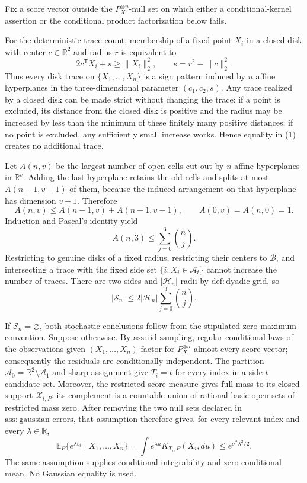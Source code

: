 Fix a score vector outside the \(P_X^{\otimes n}\)-null set on which either a conditional-kernel assertion or the conditional product factorization below fails.

For the deterministic trace count, membership of a fixed point \(X_i\) in a closed disk with center \(c\in\mathbb R^2\) and radius \(r\) is equivalent to
\[
 2c^{\mathsf T}X_i+s\ge \lVert X_i\rVert_2^2,
 \qquad s=r^2-\lVert c\rVert_2^2. \tag{1}
\]
Thus every disk trace on \(\{X_1,\ldots,X_n\}\) is a sign pattern induced by \(n\) affine hyperplanes in the three-dimensional parameter \((c_1,c_2,s)\).  Any trace realized by a closed disk can be made strict without changing the trace: if a point is excluded, its distance from the closed disk is positive and the radius may be increased by less than the minimum of these finitely many positive distances; if no point is excluded, any sufficiently small increase works.  Hence equality in (1) creates no additional trace.

Let \(A(n,v)\) be the largest number of open cells cut out by \(n\) affine hyperplanes in \(\mathbb R^v\).  Adding the last hyperplane retains the old cells and splits at most \(A(n-1,v-1)\) of them, because the induced arrangement on that hyperplane has dimension \(v-1\).  Therefore
\[
 A(n,v)\le A(n-1,v)+A(n-1,v-1),
 \qquad A(0,v)=A(n,0)=1. \tag{2}
\]
Induction and Pascal's identity yield
\[
 A(n,3)\le\sum_{j=0}^3\binom nj. \tag{3}
\]
Restricting to genuine disks of a fixed radius, restricting their centers to \(\mathcal B\), and intersecting a trace with the fixed side set \(\{i:X_i\in\mathcal A_t\}\) cannot increase the number of traces.  There are two sides and \(|\mathcal H_n|\) radii by \(\mathrm{def:dyadic\text{-}grid}\), so
\[
 |\mathscr S_n|\le2|\mathcal H_n|\sum_{j=0}^3\binom nj. \tag{4}
\]

If \(\mathscr S_n=\varnothing\), both stochastic conclusions follow from the stipulated zero-maximum convention.  Suppose otherwise.  By \(\mathrm{ass:iid\text{-}sampling}\), regular conditional laws of the observations given \((X_1,\ldots,X_n)\) factor for \(P_X^{\otimes n}\)-almost every score vector; consequently the residuals are conditionally independent.  The partition \(\mathcal A_0=\mathbb R^2\setminus\mathcal A_1\) and sharp assignment give \(T_i=t\) for every index in a side-\(t\) candidate set.  Moreover, the restricted score measure gives full mass to its closed support \(\mathcal X_{t,P}\): its complement is a countable union of rational basic open sets of restricted mass zero.  After removing the two null sets declared in \(\mathrm{ass:gaussian\text{-}errors}\), that assumption therefore gives, for every relevant index and every \(\lambda\in\mathbb R\),
\[
 \mathbb E_P\{e^{\lambda\varepsilon_i}\mid X_1,\ldots,X_n\}
 =\int e^{\lambda u}K_{T_i,P}(X_i,du)
 \le e^{\sigma^2\lambda^2/2}. \tag{5}
\]
The same assumption supplies conditional integrability and zero conditional mean.  No Gaussian equality is used.

